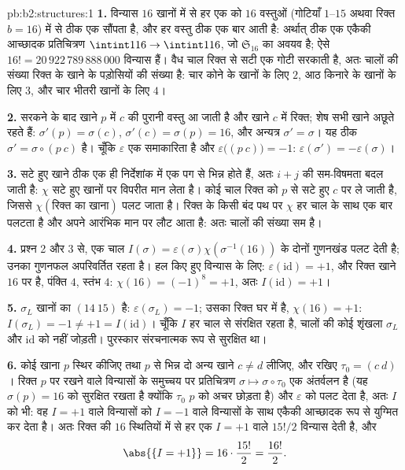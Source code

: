 \begin{solution}{pb:b2:structures:1}
\textbf{1.} विन्यास $16$ खानों में से हर एक को $16$ वस्तुओं (गोटियाँ
$1$--$15$ अथवा रिक्त $b = 16$) में से ठीक एक सौंपता है, और हर वस्तु ठीक एक
बार आती है: अर्थात् ठीक एक एकैकी आच्छादक प्रतिचित्रण $\intint1{16} \to
\intint1{16}$, जो $\mathfrak{S}_{16}$ का
अवयव है; ऐसे $16!
= 20\,922\,789\,888\,000$ विन्यास हैं। वैध चाल रिक्त से सटी एक गोटी सरकाती है,
अतः चालों की संख्या रिक्त के खाने के पड़ोसियों की संख्या है: चार कोने
के खानों के लिए $2$, आठ किनारे के खानों के लिए $3$, और चार भीतरी
खानों के लिए $4$।

\textbf{2.} सरकने के बाद खाने $p$ में $c$ की पुरानी वस्तु आ जाती है
और खाने $c$ में रिक्त; शेष सभी खाने अछूते रहते हैं: $\sigma'(p) = \sigma(c)$, $\sigma'(c) = \sigma(p) = 16$, और
अन्यत्र $\sigma' = \sigma$। यह ठीक $\sigma' = \sigma
\circ (p\ c)$ है। चूँकि $\varepsilon$ एक समाकारिता है और $\varepsilon\bigl((p\ c)\bigr) = -1$:
$\varepsilon(\sigma') = -\varepsilon(\sigma)$।

\textbf{3.} सटे हुए खाने ठीक एक ही निर्देशांक में एक पग से भिन्न होते
हैं, अतः $i + j$ की सम-विषमता बदल जाती है: $\chi$ सटे हुए खानों पर विपरीत
मान लेता है। कोई चाल रिक्त को $p$ से सटे हुए $c$ पर ले जाती है, जिससे
$\chi(\text{रिक्त का खाना})$ पलट जाता है। रिक्त के किसी बंद पथ पर $\chi$
हर चाल के साथ एक बार पलटता है और अपने आरंभिक मान पर लौट आता है: अतः
चालों की संख्या सम है।

\textbf{4.} प्रश्न 2 और 3 से, एक चाल $I(\sigma) = \varepsilon(\sigma)\chi(\sigma^{-1}(16))$ के दोनों गुणनखंड पलट देती
है; उनका गुणनफल अपरिवर्तित रहता है। हल किए हुए विन्यास के लिए: $\varepsilon(\mathrm{id}) = +1$,
और रिक्त खाने $16$ पर है, पंक्ति $4$, स्तंभ $4$: $\chi(16) = (-1)^{8} = +1$, अतः $I(\mathrm{id}) = +1$।

\textbf{5.} $\sigma_L$ खानों का  $(14\ 15)$ है: $\varepsilon(\sigma_L) = -1$; उसका रिक्त घर में है,
$\chi(16) = +1$: $I(\sigma_L) = -1 \neq +1 = I(\mathrm{id})$। चूँकि $I$ हर चाल से संरक्षित रहता है, चालों की कोई शृंखला
$\sigma_L$ और $\mathrm{id}$ को नहीं जोड़ती। पुरस्कार संरचनात्मक रूप से सुरक्षित था।

\textbf{6.} कोई खाना $p$ स्थिर कीजिए तथा $p$ से भिन्न दो अन्य खाने
$c \neq d$ लीजिए, और रखिए $\tau_0 = (c\ d)$। रिक्त $p$ पर रखने वाले विन्यासों के समुच्चय
पर प्रतिचित्रण $\sigma \mapsto \sigma
\circ \tau_0$ एक अंतर्वलन है (यह $\sigma(p) = 16$ को सुरक्षित रखता है
क्योंकि $\tau_0$ $p$ को अचर छोड़ता है) और $\varepsilon$ को पलट देता है, अतः $I$ को
भी: वह $I = +1$ वाले विन्यासों को $I = -1$ वाले विन्यासों के साथ एकैकी आच्छादक
रूप से युग्मित कर देता है। अतः रिक्त की $16$ स्थितियों में से हर एक
$I = +1$ वाले $15!/2$ विन्यास देती है, और
\[
\abs{\{I = +1\}} = 16 \cdot \frac{15!}{2} = \frac{16!}{2}.
\]


\end{solution}
